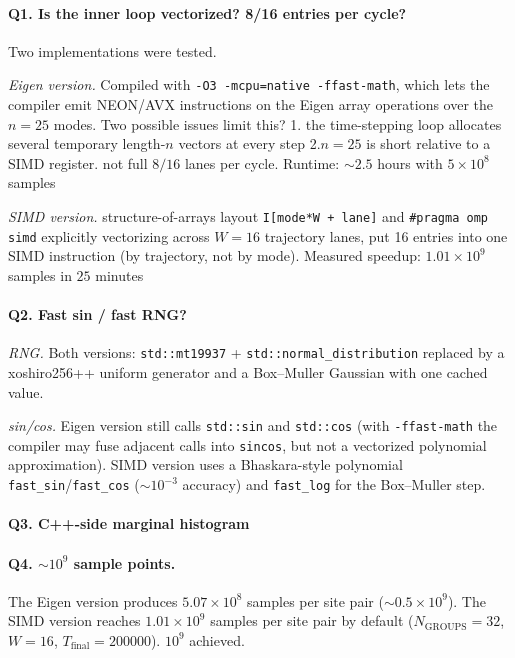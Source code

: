 \documentclass[11pt]{article}
\begin{document}
\paragraph{Q1. Is the inner loop vectorized? 8/16 entries per cycle?}
Two implementations were tested.

\emph{Eigen version.} Compiled with
\texttt{-O3 -mcpu=native -ffast-math}, which lets the compiler emit
NEON/AVX instructions on the Eigen array operations over the $n=25$ modes.
Two possible issues limit this? 1. the time-stepping loop allocates several temporary
length-$n$ vectors at every step 2.$n=25$ is short relative to a SIMD
register. not full $8/16$ lanes per cycle. Runtime: $\sim 2.5$ hours with
$5\times 10^8$ samples

\emph{SIMD version.} structure-of-arrays
layout \texttt{I[mode*W + lane]} and \texttt{\#pragma omp simd} explicitly
vectorizing across $W=16$ trajectory lanes,
put 16 entries into one SIMD instruction (by trajectory, not by mode).
Measured speedup: $1.01\times 10^9$ samples in $25$ minutes

\paragraph{Q2. Fast sin / fast RNG?}
\emph{RNG.} Both versions: \texttt{std::mt19937} +
\texttt{std::normal\_distribution} replaced by a xoshiro256++ uniform
generator and a Box--Muller Gaussian with one cached value.

\emph{sin/cos.} Eigen version still calls \texttt{std::sin} and
\texttt{std::cos} (with \texttt{-ffast-math} the compiler may fuse
adjacent calls into \texttt{sincos}, but not a vectorized polynomial
approximation). SIMD version uses a Bhaskara-style polynomial
\texttt{fast\_sin}/\texttt{fast\_cos} (${\sim}10^{-3}$ accuracy) and
\texttt{fast\_log} for the Box--Muller step.

\paragraph{Q3. C++-side marginal histogram}


\paragraph{Q4. $\sim 10^9$ sample points.}
The Eigen version produces $5.07\times 10^8$ samples per site pair
($\sim 0.5\times 10^9$). The SIMD version reaches $1.01\times 10^9$
samples per site pair by default ($N_{\mathrm{GROUPS}}=32$, $W=16$,
$T_{\mathrm{final}}=200000$). $10^9$ achieved.
\end{document}
